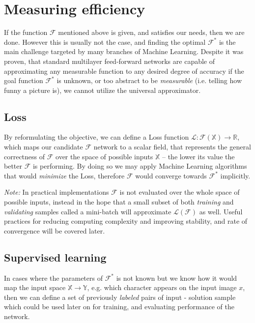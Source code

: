 \section{Measuring efficiency}
If the function $\mathcal{F}$ mentioned above is given, and satisfies our needs, then we are done.
However this is usually not the case, and finding the optimal $\mathcal{F}^*$ is the main challenge targeted by many branches of Machine Learning.
Despite it was proven, that standard multilayer
feed-forward networks are capable of approximating
any measurable function to any desired degree of
accuracy \cite{hornik1989multilayer}
if the goal function $\mathcal{F}^*$ is unknown, 
or too abstract to be \emph{measurable} (i.e. telling how funny a picture is), 
we cannot utilize the universal approximator.

\subsection{Loss} 
By reformulating the objective, we can define a Loss function $\mathcal{L}:\mathcal{F}(\mathbb{X}) \rightarrow \mathbb{R}$,
which maps our candidate $\mathcal{F}$ network to a scalar field, that represents the general correctness of $\mathcal{F}$ over the space of possible inputs $\mathbb{X}$ -- the lower its value the better $\mathcal{F}$ is performing.
By doing so we may apply Machine Learning algorithms that would \emph{minimize} the Loss, therefore $\mathcal{F}$ would converge towards $\mathcal{F}^*$ implicitly.

\emph{Note:} In practical implementations $\mathcal{F}$ is not evaluated over the whole space of possible inputs, instead in the hope that a small subset of both \emph{training} and \emph{validating} samples called a mini-batch will approximate $\mathcal{L}(\mathcal{F})$ as well. Useful practices for reducing computing complexity and improving stability, and rate of convergence will be covered later.


\subsection{Supervised learning}
In cases where the parameters of $\mathcal{F}^*$ is not known but we know how it would map the input space $\mathbb{X} \rightarrow \mathbb{Y}$, e.g. which character appears on the input image $x$, then we can define a set of previously \emph{labeled} pairs of input - solution sample which could be used later on for training, and evaluating performance of the network.

